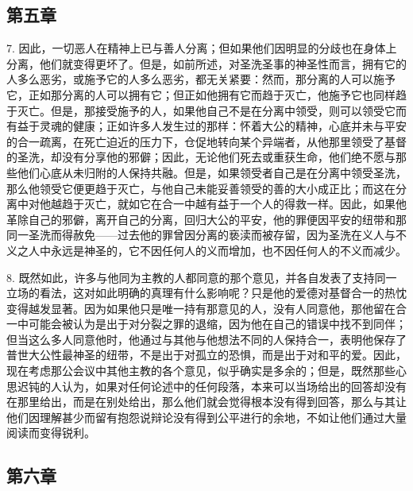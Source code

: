 
\subsection{第五章}

7. 因此，一切恶人在精神上已与善人分离；但如果他们因明显的分歧也在身体上分离，他们就变得更坏了。但是，如前所述，对圣洗圣事的神圣性而言，拥有它的人多么恶劣，或施予它的人多么恶劣，都无关紧要：然而，那分离的人可以施予它，正如那分离的人可以拥有它；但正如他拥有它而趋于灭亡，他施予它也同样趋于灭亡。但是，那接受施予的人，如果他自己不是在分离中领受，则可以领受它而有益于灵魂的健康；正如许多人发生过的那样：怀着大公的精神，心底并未与平安的合一疏离，在死亡迫近的压力下，仓促地转向某个异端者，从他那里领受了基督的圣洗，却没有分享他的邪僻；因此，无论他们死去或重获生命，他们绝不愿与那些他们心底从未归附的人保持共融。但是，如果领受者自己是在分离中领受圣洗，那么他领受它便更趋于灭亡，与他自己未能妥善领受的善的大小成正比；而这在分离中对他越趋于灭亡，就如它在合一中越有益于一个人的得救一样。因此，如果他革除自己的邪僻，离开自己的分离，回归大公的平安，他的罪便因平安的纽带和那同一圣洗而得赦免——过去他的罪曾因分离的亵渎而被存留，因为圣洗在义人与不义之人中永远是神圣的，它不因任何人的义而增加，也不因任何人的不义而减少。\par

8. 既然如此，许多与他同为主教的人都同意的那个意见，并各自发表了支持同一立场的看法，这对如此明确的真理有什么影响呢？只是他的爱德对基督合一的热忱变得越发显著。因为如果他只是唯一持有那意见的人，没有人同意他，那他留在合一中可能会被认为是出于对分裂之罪的退缩，因为他在自己的错误中找不到同伴；但当这么多人同意他时，他通过与其他与他想法不同的人保持合一，表明他保存了普世大公性最神圣的纽带，不是出于对孤立的恐惧，而是出于对和平的爱。因此，现在考虑那公会议中其他主教的各个意见，似乎确实是多余的；但是，既然那些心思迟钝的人认为，如果对任何论述中的任何段落，本来可以当场给出的回答却没有在那里给出，而是在别处给出，那么他们就会觉得根本没有得到回答，那么与其让他们因理解甚少而留有抱怨说辩论没有得到公平进行的余地，不如让他们通过大量阅读而变得锐利。\par


\subsection{第六章}

